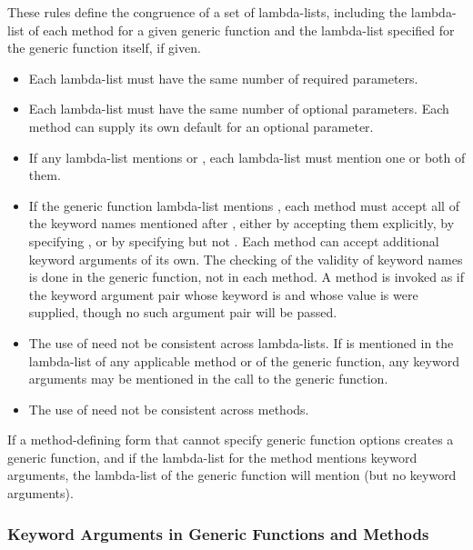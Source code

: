 These rules define the congruence of a set of lambda-lists, including the
lambda-list of each method for a given generic function and the
lambda-list specified for the generic function itself, if given.

\begin{itemize}

\item Each lambda-list must have the same number of required
parameters.

\item Each lambda-list must have the same number of optional
parameters.  Each method can supply its own default for an optional
parameter.

\item If any lambda-list mentions  or , each
lambda-list must mention one or both of them.

\item If the generic function lambda-list mentions , each
method must accept all of the keyword names mentioned after ,
either by accepting them explicitly, by specifying 
, or by specifying  but not .
Each method can accept additional keyword arguments of its own.  The
checking of the validity of keyword names is done in the generic
function, not in each method. A method is invoked as if the keyword
argument pair whose  keyword is  and whose value
is  were supplied, though no such argument pair will be passed.

\item The use of  need not be consistent
across lambda-lists.  If  is mentioned in 
the lambda-list of any applicable method or of the generic function,
any keyword arguments may be mentioned in the call to the
generic function.

\item The use of  need not be consistent across methods.
\end{itemize}


If a method-defining form that cannot specify generic function options
creates a generic function, and if the lambda-list for the method
mentions keyword arguments, the lambda-list of the generic function
will mention  (but no keyword arguments).


\subsubsection{Keyword Arguments in Generic Functions and Methods}

